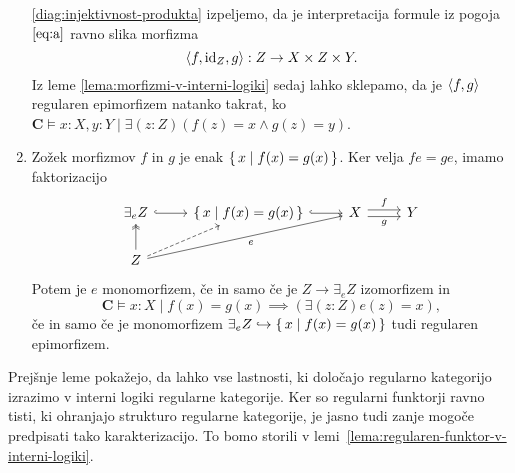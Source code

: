 \documentclass[../kategoricna_logika.tex]{subfiles}
\begin{document}
\begin{dokaz}
\begin{enumerate}[label=(\roman*)]
      \eqref{diag:injektivnost-produkta} izpeljemo, da je
      interpretacija formule iz pogoja $\eqref{eq:a}$ ravno slika morfizma
      \[\langle f, \mathrm{id}_{Z}, g \rangle : Z \to X \times Z \times Y.\]
      Iz leme \ref{lema:morfizmi-v-interni-logiki} sedaj lahko
      sklepamo, da je $\langle f,g \rangle$ regularen epimorfizem natanko
      takrat, ko
      $\mathbf{C} \models x:X,y:Y \mid \exists (z:Z) (f(z) = x \land g(z) = y)$.
      
    \item Zožek morfizmov $f$ in $g$ je enak
      $\lbrace\,x \mid f(x) = g(x)\,\rbrace$.  Ker velja
      ${f e = g e}$, imamo faktorizacijo
      \begin{equation*}
        \begin{tikzcd}
          \exists_{e}Z \ar[r, hook] & \set{x \mid f(x) = g(x)} \ar[r,
          hook] &
          X \ar[r, shift left, "f"] \ar[r, shift right, "g"'] & Y \\
          Z \ar[u, two heads] \ar[ur, dashed] \ar[urr, "e"']
        \end{tikzcd}
      \end{equation*}
      Potem je $e$ monomorfizem, če in samo če je
      $Z \to \exists_{e}Z$ izomorfizem in
      \[\mathbf{C} \models x:X \mid f(x) = g(x) \implies (\exists (z:Z) e(z) =
        x),\] če in samo če je monomorfizem
      $\exists_{e}Z \hookrightarrow \lbrace\,x \mid f(x) = g(x)\,\rbrace$ tudi
      regularen epimorfizem.\qedhere
    \end{enumerate}
  \end{dokaz}%
  Prejšnje leme pokažejo, da lahko vse lastnosti, ki določajo
  regularno kategorijo izrazimo v interni logiki regularne kategorije.
  Ker so regularni funktorji ravno tisti, ki ohranjajo strukturo regularne
  kategorije, je jasno tudi zanje mogoče predpisati tako karakterizacijo.
  To bomo storili v lemi~\ref{lema:regularen-funktor-v-interni-logiki}.
%
\end{document}
